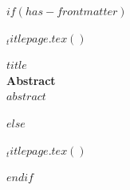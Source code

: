 $if(has-frontmatter)$
  \begin{frontmatter}
  \begin{titlepage}
  $_titlepage.tex()$
  
  \end{titlepage}
  
	\center %

  	{\huge\bfseries $title$}\\[2cm] %

  	{\large\bfseries Abstract}\\[0.4cm] %

$abstract$
  
  \end{frontmatter}
$else$
  \begin{titlepage}
  $_titlepage.tex()$
  
  \end{titlepage}
$endif$

  